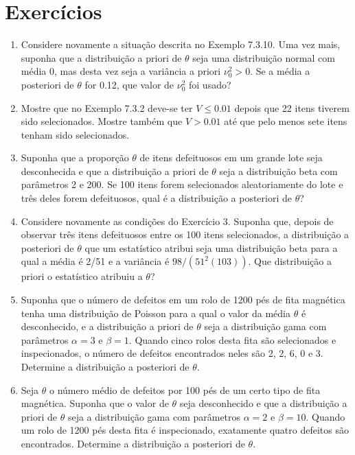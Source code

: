 \section*{Exercícios}
\begin{enumerate}
    \item Considere novamente a situação descrita no Exemplo 7.3.10. Uma vez mais, suponha que a distribuição a priori de $\theta$ seja uma distribuição normal com média 0, mas desta vez seja a variância a priori $\nu_0^2 > 0$. Se a média a posteriori de $\theta$ for 0.12, que valor de $\nu_0^2$ foi usado?
    
    \item Mostre que no Exemplo 7.3.2 deve-se ter $V \le 0.01$ depois que 22 itens tiverem sido selecionados. Mostre também que $V > 0.01$ até que pelo menos sete itens tenham sido selecionados.
    
    \item Suponha que a proporção $\theta$ de itens defeituosos em um grande lote seja desconhecida e que a distribuição a priori de $\theta$ seja a distribuição beta com parâmetros 2 e 200. Se 100 itens forem selecionados aleatoriamente do lote e três deles forem defeituosos, qual é a distribuição a posteriori de $\theta$?
    
    \item Considere novamente as condições do Exercício 3. Suponha que, depois de observar três itens defeituosos entre os 100 itens selecionados, a distribuição a posteriori de $\theta$ que um estatístico atribui seja uma distribuição beta para a qual a média é 2/51 e a variância é $98/(51^2(103))$. Que distribuição a priori o estatístico atribuiu a $\theta$?
    
    \item Suponha que o número de defeitos em um rolo de 1200 pés de fita magnética tenha uma distribuição de Poisson para a qual o valor da média $\theta$ é desconhecido, e a distribuição a priori de $\theta$ seja a distribuição gama com parâmetros $\alpha=3$ e $\beta=1$. Quando cinco rolos desta fita são selecionados e inspecionados, o número de defeitos encontrados neles são 2, 2, 6, 0 e 3. Determine a distribuição a posteriori de $\theta$.
    
    \item Seja $\theta$ o número médio de defeitos por 100 pés de um certo tipo de fita magnética. Suponha que o valor de $\theta$ seja desconhecido e que a distribuição a priori de $\theta$ seja a distribuição gama com parâmetros $\alpha=2$ e $\beta=10$. Quando um rolo de 1200 pés desta fita é inspecionado, exatamente quatro defeitos são encontrados. Determine a distribuição a posteriori de $\theta$.
    

\end{enumerate}
